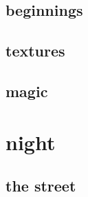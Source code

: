 \documentclass{article}
\begin{document}
\subsection{beginnings}

\clearpage
\subsection{textures}

\clearpage
\subsection{magic}

\clearpage

\section{night}
\subsection{the street}

\clearpage
\end{document}
